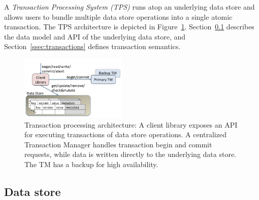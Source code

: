


A \emph{Transaction Processing System (TPS)} runs atop an underlying data store and 
allows users to bundle multiple data store operations into a single atomic transaction. 
The TPS architecture is depicted in Figure~\ref{fig:components}.
Section~\ref{ssec:data-model} describes the data model and API of the underlying data store, and  Section~\ref{ssec:transactions}
defines transaction semantics. 

\begin{figure}
\centerline{
\includegraphics[width=0.45\textwidth]{FragolaComponents.jpg}
}
\caption{Transaction processing architecture: A client library exposes an  API for  executing transactions of data store operations. 
A centralized Transaction Manager handles transaction begin and commit requests, while data is written directly to the underlying data store.
The TM has a backup for high availability.}
\label{fig:components}
\end{figure}

\subsection{Data store}
\label{ssec:data-model}

